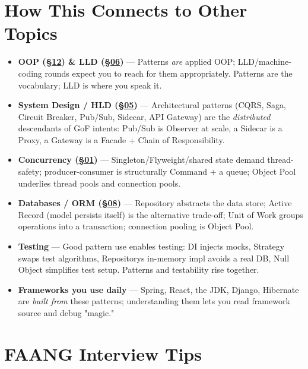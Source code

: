 \documentclass[11pt]{article}
\begin{document}
\section{How This Connects to Other Topics}\label{how-this-connects-to-other-topics}

\begin{itemize}
\item
  \textbf{OOP (\hyperlink{section.12}{\textcolor{acc}{§12}}) \& LLD (\hyperlink{section.06}{\textcolor{acc}{§06}})} --- Patterns \emph{are} applied OOP; LLD/machine-coding rounds expect you to reach for them appropriately. Patterns are the vocabulary; LLD is where you speak it.
\item
  \textbf{System Design / HLD (\hyperlink{section.05}{\textcolor{acc}{§05}})} --- Architectural patterns (CQRS, Saga, Circuit Breaker, Pub/Sub, Sidecar, API Gateway) are the \emph{distributed} descendants of GoF intents: Pub/Sub is Observer at scale, a Sidecar is a Proxy, a Gateway is a Facade + Chain of Responsibility.
\item
  \textbf{Concurrency (\hyperlink{section.01}{\textcolor{acc}{§01}})} --- Singleton/Flyweight/shared state demand thread-safety; producer-consumer is structurally Command + a queue; Object Pool underlies thread pools and connection pools.
\item
  \textbf{Databases / ORM (\hyperlink{section.08}{\textcolor{acc}{§08}})} --- Repository abstracts the data store; Active Record (model persists itself) is the alternative trade-off; Unit of Work groups operations into a transaction; connection pooling is Object Pool.
\item
  \textbf{Testing} --- Good pattern use enables testing: DI injects mocks, Strategy swaps test algorithms, Repository\textquotesingle s in-memory impl avoids a real DB, Null Object simplifies test setup. Patterns and testability rise together.
\item
  \textbf{Frameworks you use daily} --- Spring, React, the JDK, Django, Hibernate are \emph{built from} these patterns; understanding them lets you read framework source and debug "magic."
\end{itemize}

\section{FAANG Interview Tips}\label{faang-interview-tips}
\end{document}
